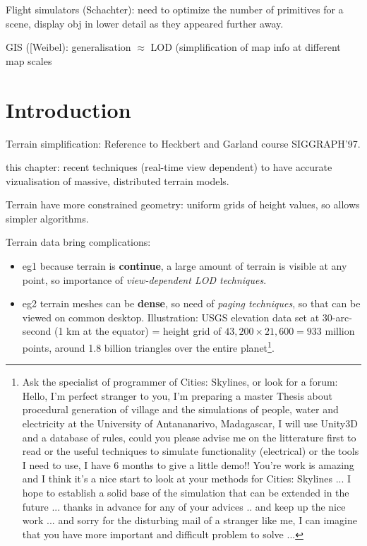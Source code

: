 \documentclass[11pt]{report}
\begin{document}
Flight simulators (Schachter): need to optimize the number of primitives for a scene, display obj in lower detail as they appeared further away.

GIS ([Weibel): generalisation $\approx$ LOD (simplification of map info at different map scales

\section{Introduction}

Terrain simplification: Reference to Heckbert and Garland course SIGGRAPH'97.

this chapter: recent techniques (real-time view dependent) to have accurate vizualisation of massive, distributed terrain models.

Terrain have more constrained geometry: uniform grids of height values, so allows simpler algorithms.

Terrain data bring complications:
\begin{itemize}
\item eg1 because terrain is \textbf{continue}, a large amount of terrain is visible at any point, so importance of \textit{view-dependent LOD techniques}.
\item eg2 terrain meshes can be \textbf{dense}, so need of \textit{paging techniques}, so that can be viewed on common desktop. Illustration: USGS elevation data set at 30-arc-second (1 km at the equator) = height grid of $43,200 \times 21,600 = 933 $ million points, around 1.8 billion triangles over the entire planet\footnote{Ask the specialist of programmer of Cities: Skylines, or look for a forum: Hello, I'm perfect stranger to you, I'm preparing a master Thesis about procedural generation of village and the simulations of people, water and electricity at the University of Antananarivo, Madagascar, I will use Unity3D and a database of rules, could you please advise me on the litterature first to read or the useful techniques to simulate functionality (electrical) or the tools I need to use, I have 6 months to give a little demo!! You're work is amazing and I think it's a nice start to look at your methods for Cities: Skylines ... I hope to establish a solid base of the simulation that can be extended in the future ... thanks in advance for any of your advices .. and keep up the nice work ... and sorry for the disturbing mail of a stranger like me, I can imagine that you have more important and difficult problem to solve ...}.
\end{itemize}
 
\end{document}
